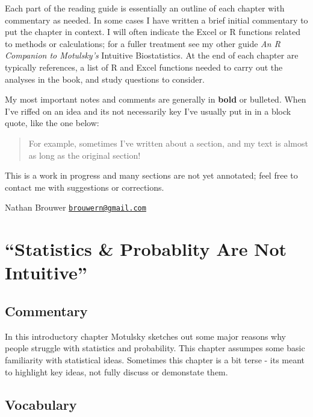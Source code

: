 \documentclass[]{book}
\theoremstyle{definition}
\theoremstyle{definition}
\theoremstyle{definition}
\theoremstyle{remark}
\begin{document}
Each part of the reading guide is essentially an outline of each chapter
with commentary as needed. In some cases I have written a brief initial
commentary to put the chapter in context. I will often indicate the
Excel or R functions related to methods or calculations; for a fuller
treatment see my other guide \emph{An R Companion to Motulsky's}
Intuitive Biostatistics. At the end of each chapter are typically
references, a list of R and Excel functions needed to carry out the
analyses in the book, and study questions to consider.

My most important notes and comments are generally in \textbf{bold} or
bulleted. When I've riffed on an idea and its not necessarily key I've
usually put in in a block quote, like the one below:

\begin{quote}
For example, sometimes I've written about a section, and my text is
almost as long as the original section!
\end{quote}

This is a work in progress and many sections are not yet annotated; feel
free to contact me with suggestions or corrections.

Nathan Brouwer
\href{mailto:brouwern@gmail.com}{\nolinkurl{brouwern@gmail.com}}

\chapter{\texorpdfstring{``Statistics \& Probablity Are Not
Intuitive''}{Statistics \& Probablity Are Not Intuitive}}\label{intro1}

\section*{Commentary}\label{commentary}

In this introductory chapter Motulsky sketches out some major reasons
why people struggle with statistics and probability. This chapter
assumpes some basic familiarity with statistical ideas. Sometimes this
chapter is a bit terse - its meant to highlight key ideas, not fully
discuss or demonstate them.

\section*{Vocabulary}\label{vocabulary}
\end{document}

